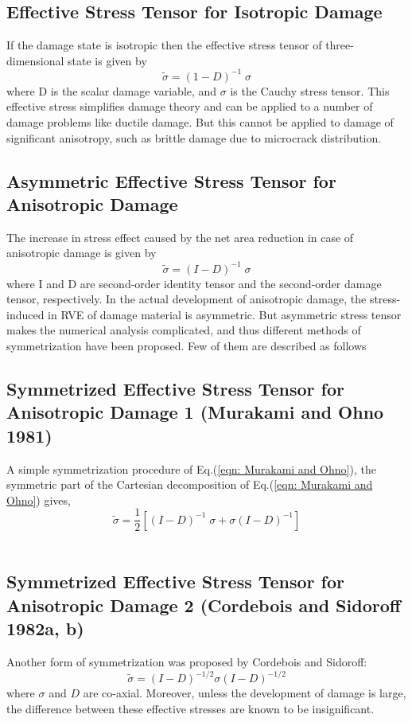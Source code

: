 \documentclass[a4paper,12pt,twoside]{report}
\begin{document}
\subsection{Effective Stress Tensor for Isotropic Damage}
\indent\indent\indent If the damage state is isotropic then the effective stress tensor of three-dimensional state is given by
\begin{equation}
\tilde{\sigma} = (1 - D)^{-1} \; \sigma
\end{equation}
where D is the scalar damage variable, and $\sigma$ is the Cauchy stress tensor. This effective stress simplifies damage theory and can be applied to a number of damage problems like ductile damage. But this cannot be applied to damage of significant anisotropy, such as brittle damage due to microcrack distribution.\\
\subsection{Asymmetric Effective Stress Tensor for Anisotropic Damage}
\indent\indent\indent The increase in stress effect caused by the net area reduction in case of anisotropic damage is given by
\begin{equation}
\tilde{\sigma} = (I - D)^{-1} \; \sigma
\end{equation}
where I and D are second-order identity tensor and the second-order damage tensor, respectively. In the actual development of anisotropic damage, the stress-induced in RVE of damage material is asymmetric. But asymmetric stress tensor makes the numerical analysis complicated, and thus different methods of symmetrization have been proposed. Few of them are described as follows

\subsection{Symmetrized Effective Stress Tensor for Anisotropic Damage 1 (Murakami and Ohno 1981)} 
\indent\indent\indent A simple symmetrization procedure of Eq.(\ref{eqn: Murakami and Ohno}), the symmetric part of the Cartesian decomposition of Eq.(\ref{eqn: Murakami and Ohno}) gives,
\begin{equation}
\label{eqn: Murakami and Ohno}
\tilde{\sigma} = \frac{1}{2} [(I - D)^{-1}\;\sigma + \sigma(I - D)^{-1}]
\end{equation}\\
\subsection{Symmetrized Effective Stress Tensor for Anisotropic Damage 2 (Cordebois and Sidoroff 1982a, b)}
\indent\indent\indent Another form of symmetrization was proposed by Cordebois and Sidoroff:
\begin{equation}
\label{eqn:Cordebois and Sidoroff }
\tilde{\sigma} =  (I - D)^{-1/2}\sigma(I - D)^{-1/2}
\end{equation}
where $\sigma$ and $D$ are co-axial. Moreover, unless the development of damage is large, the difference between these effective stresses are known to be insignificant.\\
\end{document}
